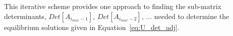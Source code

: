 \documentclass[review]{elsarticle}
\begin{document}
This iterative scheme provides one approach to finding the sub-matrix determinants, $Det[A_{i_{max}-1}]$, $Det[A_{i_{max}-2}]$, $... $ needed to determine the equilibrium solutions given in Equation~\ref{eq:U_det_adj}. 



 




\end{document}
